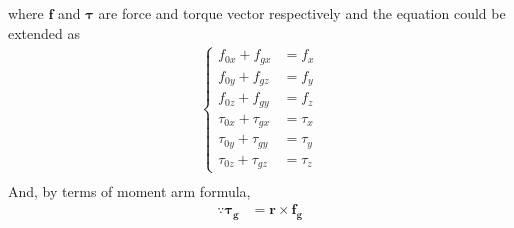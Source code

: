 where $\boldsymbol{f}$ and $\boldsymbol{\tau}$ are force and torque vector respectively and the equation could be extended as 
\begin{equation*}
\begin{split}
\left\{\begin{matrix}
f_{0x} 				+f_{gx} 			&= f_x\\ 
f_{0y}				+f_{gz} 			&= f_y\\ 
f_{0z}				+f_{gy} 			&= f_z\\ 
\tau_{0x}			+\tau_{gx} 			&=\tau _x\\ 
\tau_{0y}			+\tau_{gy} 			&=\tau _y \\ 
\tau_{0z}			+\tau_{gz} 			&=\tau _z 
\end{matrix}\right.	\\
\end{split}
\end{equation*}
And, by terms of moment arm formula,
\begin{equation}
\begin{split}
\because
\boldsymbol{\tau_g}	&= \boldsymbol{r} \times \boldsymbol{f_g} \\
\end{split}
\end{equation}

